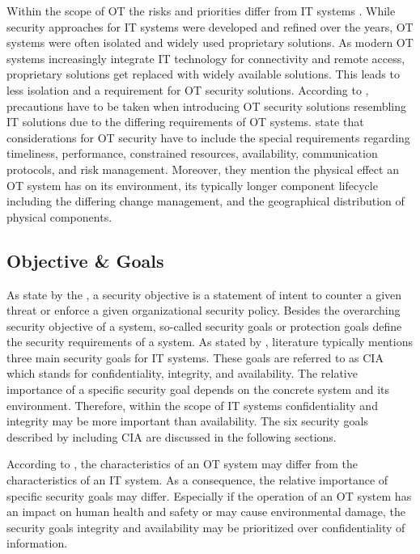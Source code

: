 Within the scope of OT the risks and priorities differ from IT systems \cite{Stouffer2023}.
While security approaches for IT systems were developed and refined over the years, OT systems were often isolated and widely used proprietary solutions.
As modern OT systems increasingly integrate IT technology for connectivity and remote access, proprietary solutions get replaced with widely available solutions.
This leads to less isolation and a requirement for OT security solutions.
According to \citeauthor{Stouffer2023}, precautions have to be taken when introducing OT security solutions resembling IT solutions due to the differing requirements of OT systems.
\citeauthor{Stouffer2023} state that considerations for OT security have to include the special requirements regarding timeliness, performance, constrained resources, availability, communication protocols, and risk management.
Moreover, they mention the physical effect an OT system has on its environment, its typically longer component lifecycle including the differing change management, and the geographical distribution of physical components.

\subsection{Objective \& Goals}
As state by the \citeauthor{nsa2009} \cite{nsa2009}, a security objective is a statement of intent to counter a given threat or enforce a given organizational security policy.
Besides the overarching security objective of a system, so-called security goals or protection goals define the security requirements of a system.
As stated by \citeauthor{Eckert2023} \cite{Eckert2023}, literature typically mentions three main security goals for IT systems.
These goals are referred to as CIA which stands for confidentiality, integrity, and availability.
The relative importance of a specific security goal depends on the concrete system and its environment.
Therefore, within the scope of IT systems confidentiality and integrity may be more important than availability.
The six security goals described by \citeauthor{Eckert2023} including CIA are discussed in the following sections.

According to \citeauthor{Stouffer2023} \cite{Stouffer2023}, the characteristics of an OT system may differ from the characteristics of an IT system.
As a consequence, the relative importance of specific security goals may differ.
Especially if the operation of an OT system has an impact on human health and safety or may cause environmental damage, the security goals integrity and availability may be prioritized over confidentiality of information.

